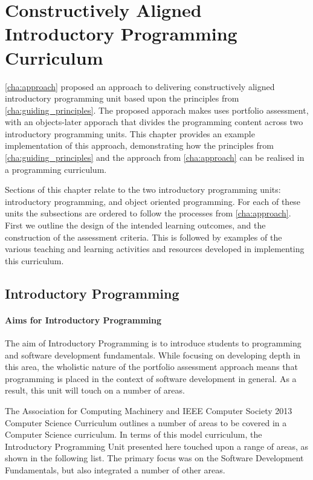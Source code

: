 
\chapter{Constructively Aligned Introductory Programming Curriculum} %
\label{cha:example_impl}

\cref{cha:approach} proposed an approach to delivering constructively aligned introductory programming unit based upon the principles from \cref{cha:guiding_principles}. The proposed apporach makes uses portfolio assessment, with an objects-later apporach that divides the programming content across two introductory programming units. This chapter provides an example implementation of this approach, demonstrating how the principles from \cref{cha:guiding_principles} and the approach from \cref{cha:approach} can be realised in a programming curriculum.

Sections of this chapter relate to the two introductory programming units: introductory programming, and object oriented programming. For each of these units the subsections are ordered to follow the processes from \cref{cha:approach}. First we outline the design of the intended learning outcomes, and the construction of the assessment criteria. This is followed by examples of the various teaching and learning activities and resources developed in implementing this curriculum.  


\section{Introductory Programming} %
\label{sec:introductory_programming}

\subsubsection{Aims for Introductory Programming} %
\label{ssub:intro:aims}

The aim of Introductory Programming is to introduce students to programming and software development fundamentals. While focusing on developing depth in this area, the wholistic nature of the portfolio assessment approach means that programming is placed in the context of software development in general. As a result, this unit will touch on a number of areas.

The Association for Computing Machinery and IEEE Computer Society 2013 Computer Science Curriculum \cite{CSC2013} outlines a number of areas to be covered in a Computer Science curriculum. In terms of this model curriculum, the Introductory Programming Unit presented here touched upon a range of areas, as shown in the following list. The primary focus was on the Software Development Fundamentals, but also integrated a number of other areas.

